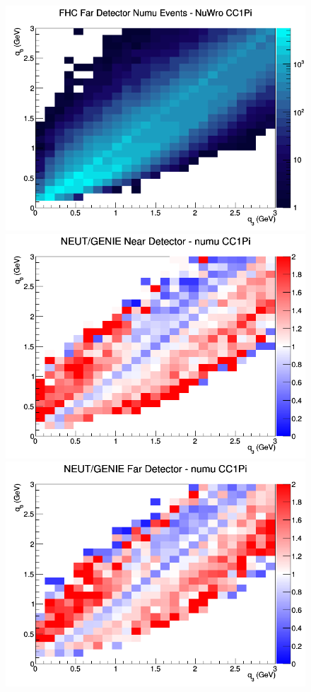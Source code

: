 \begin{figure}[h]
\endminipage
{}
\includegraphics[width=\linewidth]{eff_q0_q3/FGT/CC1Pi_FHC_FD_numu_q3_q0_NuWro.png}
\endminipage
\newline
{}
\includegraphics[width=\linewidth]{eff_q0_q3/FGT/ratios/CC1Pi_NEUT_GENIE_numu_near_q3_q0.png}
\endminipage
{}
\includegraphics[width=\linewidth]{eff_q0_q3/FGT/ratios/CC1Pi_NEUT_GENIE_numu_far_q3_q0.png}

\end{figure}
